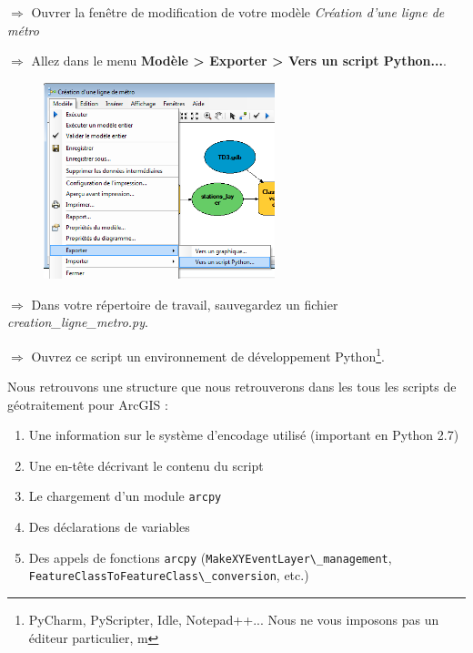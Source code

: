 \documentclass[11pt]{article}
\newcommand{\action}{$\Rightarrow$ }
\newcommand{\code}[1]{\lstinline{#1}}
\begin{document}
\action Ouvrer la fenêtre de modification de votre modèle \textit{Création d'une ligne de métro}

\action Allez dans le menu \textbf{Modèle > Exporter > Vers un script Python...}.
\begin{figure}[H]
	\center \includegraphics[width=0.6\textwidth]{img/td3/modelbuilder_export.png}\\
\end{figure}

\action Dans votre répertoire de travail, sauvegardez un fichier \textit{creation\_ligne\_metro.py}.

\action Ouvrez ce script un environnement de développement Python\footnote{PyCharm, PyScripter, Idle, Notepad++... Nous ne vous imposons pas un éditeur particulier, m}.

Nous retrouvons une structure que nous retrouverons dans les tous les scripts de géotraitement pour ArcGIS :
\begin{enumerate}
	\item Une information sur le système d'encodage utilisé (important en Python 2.7)
	\item Une en-tête décrivant le contenu du script
	\item Le chargement d'un module \code{arcpy}
	\item Des déclarations de variables
	\item Des appels de fonctions \code{arcpy} (\code{MakeXYEventLayer\_management}, \code{FeatureClassToFeatureClass\_conversion}, etc.)
\end{enumerate}
\end{document}
